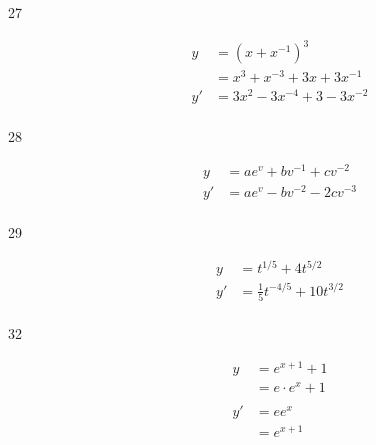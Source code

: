 \documentclass[letterpaper]{exam}
\begin{document}
\begin{description}
    \item[27] 
      \begin{align*}
        y  & = \left(x + x^{-1} \right)^3 \\
           & = x^3 + x^{-3} + 3x + 3x^{-1} \\
        y' & = \boxed{ 3x^2 - 3x^{-4} + 3 - 3x^{-2} } \\
      \end{align*}

    \item[28] 
      \begin{align*}
        y  & = ae^v + bv^{-1} + cv^{-2} \\
        y' & = \boxed{ ae^v - bv^{-2} - 2cv^{-3} } \\
      \end{align*}

    \item[29] 
      \begin{align*}
        y  & = t^{1/5} + 4t^{5/2} \\
        y' & = \boxed{ \frac{1}{5} t^{-4/5} + 10 t^{3/2} } \\
      \end{align*}



    \item[32] 
      \begin{align*}
        y  & = e^{x + 1} + 1 \\
           & = e \cdot e^x + 1 \\
        \\
        y' & = e e^x \\
           & = \boxed{ e^{x + 1} } \\
      \end{align*}


\end{description}
\end{document}
